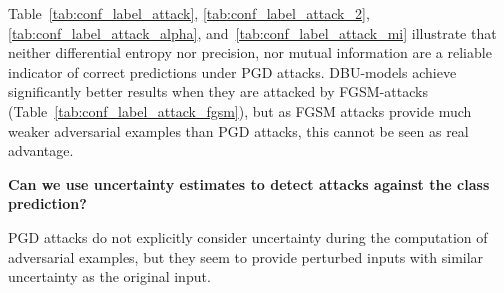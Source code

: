 Table~\ref{tab:conf_label_attack}, \ref{tab:conf_label_attack_2}, \ref{tab:conf_label_attack_alpha}, and~\ref{tab:conf_label_attack_mi} illustrate that neither differential entropy nor precision, nor mutual information are a reliable indicator of correct predictions under PGD attacks. 
DBU-models achieve significantly better results when they are attacked by FGSM-attacks (Table~\ref{tab:conf_label_attack_fgsm}), but as FGSM attacks provide much weaker adversarial examples than PGD attacks, this cannot be seen as real advantage. 





\clearpage
\textbf{Can we use uncertainty estimates to detect attacks against the class prediction?}

PGD attacks do not explicitly consider uncertainty during the computation of adversarial examples, but they seem to provide perturbed inputs with similar uncertainty as the original input. 



\begin{table}[htbp!]
 	\centering
 	\caption{Attack-Detection based on differential entropy under PGD label attacks (AUC-PR).}
 	\begin{small}
 	\end{small}
 	\label{tab:label_attack_detect_2}
\end{table}




